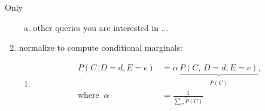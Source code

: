 \begin{frame}{Only}
\begin{enumerate}
\begin{enumerate}[(a)]
  \item other queries you are interested in $\ldots$
  \end{enumerate}
  \item<only@11> normalize to compute conditional marginals:
  \begin{enumerate}
  \item[]
  \slidesonly{\vspace{-3mm}}
   \begin{align}
            P(C\, | D = d, E = e) &= \alpha \, \underbrace{P(C, \,D = d, E = e)}_{\tilde P(C)},\\
            \text{where} \;\; \alpha &= \frac{1}{\sum_C \tilde P(C)}
		\end{align}
  \end{enumerate}
  
\end{enumerate}
 \endgroup
\end{frame}



